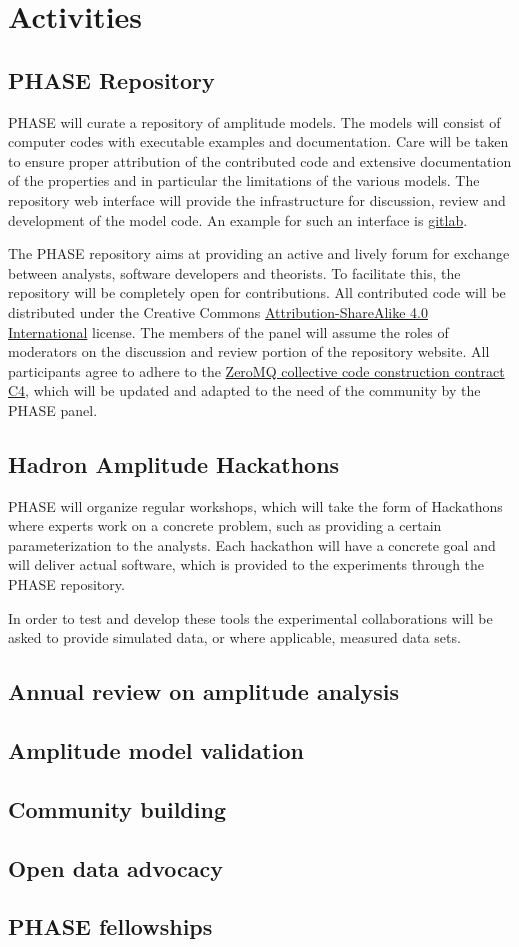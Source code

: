 \section{Activities}
\label{sec:activities}
\subsection{PHASE Repository}
PHASE will curate a repository of amplitude models. The models will consist of computer codes with executable examples and documentation. Care will be taken to ensure proper attribution of the contributed code and extensive documentation of the properties and in particular the limitations of the various models. The repository web interface will provide the infrastructure for discussion, review and development of the model code. An example for such an interface is \href{https://about.gitlab.com/}{gitlab}. 

The PHASE repository aims at providing an active and lively forum for exchange between analysts, software developers and theorists. To facilitate this, the repository will be completely open for contributions. All contributed code will be distributed under the Creative Commons
\href{https://creativecommons.org/licenses/by-sa/4.0/}{Attribution-ShareAlike 4.0 International} license. The members of the panel will assume the roles of moderators on the discussion and review portion of the repository website. All participants agree to adhere to the \href{https://rfc.zeromq.org/spec:42/C4/}{ZeroMQ collective code construction contract C4}, which will be updated and adapted to the need of the community by the PHASE panel.

\subsection{Hadron Amplitude Hackathons}
PHASE will organize regular workshops, which will take the form of Hackathons where experts work on a concrete problem, such as providing a certain parameterization to the analysts. Each hackathon will have a concrete goal and will deliver actual software, which is provided to the experiments through the PHASE repository.

In order to test and develop these tools the experimental collaborations will be asked to provide simulated data, or where applicable, measured data sets. 

\subsection{Annual review on amplitude analysis}

\subsection{Amplitude model validation}

\subsection{Community building}

\subsection{Open data advocacy}

\subsection{PHASE fellowships}